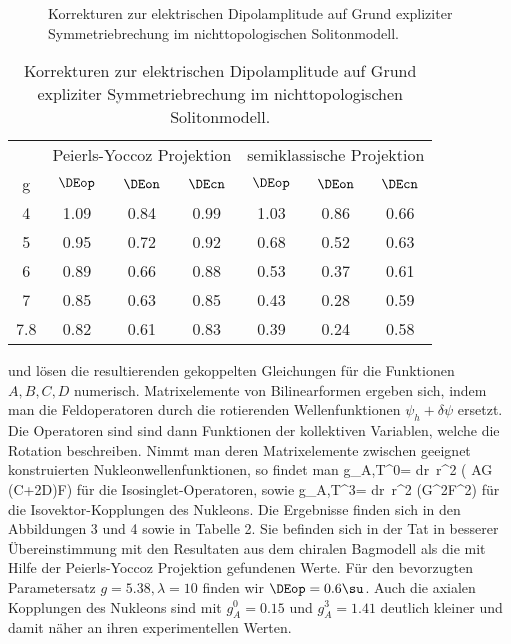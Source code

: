 \begin{figure}
\caption{Korrekturen zur elektrischen Dipolamplitude auf Grund expliziter 
Symmetriebrechung im nichttopologischen Solitonmodell.}
\vspace{8cm}
\end{figure}
\begin{table}
\caption{Korrekturen zur elektrischen Dipolamplitude auf Grund expliziter
Symmetriebrechung im nichttopologischen Solitonmodell.}
\begin{center}
\begin{tabular}{|c||c|c|c||c|c|c|}\hline
          & \multicolumn{3}{|c||}{Peierls-Yoccoz Projektion} 
	  & \multicolumn{3}{c|}{semiklassische Projektion}  \\  
   g      & $\DEop$         & $\DEon$        & $\DEcn$
          & $\DEop$         & $\DEon$        & $\DEcn$\\ \hline\hline
   4      &   1.09 & 0.84 & 0.99 & 1.03 & 0.86 & 0.66 \\ 
   5      &   0.95 & 0.72 & 0.92 & 0.68 & 0.52 & 0.63 \\ 
   6      &   0.89 & 0.66 & 0.88 & 0.53 & 0.37 & 0.61 \\ 
   7      &   0.85 & 0.63 & 0.85 & 0.43 & 0.28 & 0.59 \\ 
   7.8    &   0.82 & 0.61 & 0.83 & 0.39 & 0.24 & 0.58 \\ \hline
\end{tabular}   
\end{center}
\end{table}
und l\"osen die resultierenden gekoppelten Gleichungen f\"ur die 
Funktionen $A,B,C,D$ numerisch. Matrixelemente von Bilinearformen 
ergeben sich, indem man die Feldoperatoren durch die rotierenden
Wellenfunktionen $\psi_h+\delta\psi$ ersetzt.  Die Operatoren sind 
sind dann Funktionen der kollektiven Variablen, welche die 
Rotation beschreiben. Nimmt man deren Matrixelemente zwischen
geeignet konstruierten Nukleonwellenfunktionen, so findet man 
\be
 g_{A,T}^{0}=  \int dr\, r^2
 ( AG \pm {}(C+2D)F)
\ee
f\"ur die Isosinglet-Operatoren, sowie
\be
g_{A,T}^{3}= \int dr\, r^2 (G^2\mp{}F^2)
\ee
f\"ur die Isovektor-Kopplungen des Nukleons. Die Ergebnisse finden
sich in den Abbildungen 3 und 4 sowie in Tabelle 2. Sie befinden 
sich in der Tat in besserer \"Ubereinstimmung mit den Resultaten
aus dem chiralen Bagmodell als die mit Hilfe der Peierls-Yoccoz
Projektion gefundenen Werte. F\"ur den bevorzugten Parametersatz
$g=5.38,\lambda =10$ finden wir $\DEop=0.6\su$. Auch die axialen
Kopplungen des Nukleons sind mit $g_A^0=0.15$ und $g_A^3=1.41$ 
deutlich kleiner und damit n\"aher an ihren experimentellen 
Werten. 



